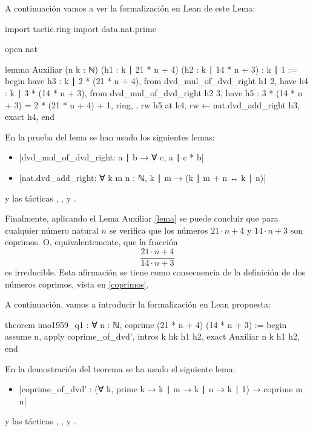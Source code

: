 A continuación vamos a ver la formalización en Lean de este Lema:

\begin{leancode}
import tactic.ring
import data.nat.prime

open nat

lemma Auxiliar
  (n k : ℕ)
  (h1 : k ∣ 21 * n + 4)
  (h2 : k ∣ 14 * n + 3)
  : k ∣ 1 :=
begin
  have h3 : k ∣ 2 * (21 * n + 4),
    from dvd_mul_of_dvd_right h1 2,
  have h4 : k ∣ 3 * (14 * n + 3),
    from dvd_mul_of_dvd_right h2 3,
  have h5 : 3 * (14 * n + 3) = 2 * (21 * n + 4) + 1,
    { ring, },
  rw h5 at h4,
  rw ← nat.dvd_add_right h3,
  exact h4,
end
\end{leancode}

En la prueba del lema se han usado los siguientes lemas:
\begin{itemize}
\item {}|dvd_mul_of_dvd_right: a ∣ b → ∀ c, a ∣ c * b|
\item {}|nat.dvd_add_right: ∀ {k m n : ℕ}, k ∣ m → (k ∣ m + n ↔ k ∣ n)|
\end{itemize}
y las tácticas
,
,
 y
.

Finalmente, aplicando el Lema Auxiliar \ref{lema} se puede concluir que para
cualquier número natural \(n\) se verifica que los números \(21⋅n+4\)
y \(14⋅n+3\) son coprimos. O, equivalentemente, que la fracción
\begin{equation*}
  \frac{21⋅n+4}{14⋅n+3}
\end{equation*}
es irreducible. Esta afirmación se tiene como consecuencia de la
definición de dos números coprimos, vista en \ref{coprimos}.

A continuación, vamos a introducir la formalización en Lean propuesta:

\begin{leancode}
theorem imo1959_q1 : ∀ n : ℕ, coprime (21 * n + 4) (14 * n + 3) :=
begin
  assume n,
  apply coprime_of_dvd',
  intros k hk h1 h2,
  exact Auxiliar n k h1 h2,
end
\end{leancode}

En la demostración del teorema se ha usado el siguiente lema:
\begin{itemize}
\item {}|coprime_of_dvd' :
  (∀ k, prime k → k ∣ m → k ∣ n → k ∣ 1) → coprime m n|
\end{itemize}
y las tácticas
,
,
 y
.

